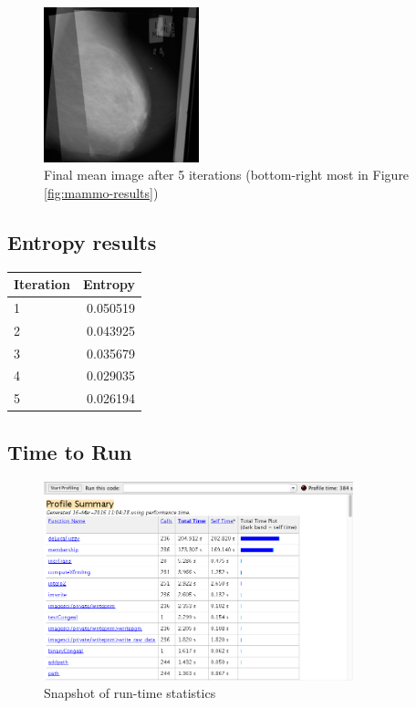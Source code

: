 \documentclass[11pt,fleqn,twoside]{article}
\begin{document}
\begin{figure}[!ht]
  \centering
  \includegraphics[width=0.4\textwidth]{img/final_mean.jpg}
  \caption{Final mean image after 5 iterations (bottom-right most in Figure \ref{fig:mammo-results})}
  \label{fig:final-mean}
\end{figure}

\subsection{Entropy results}

  \begin{tabular}{ | l | r | }
    \hline
    \textbf{Iteration} & \textbf{Entropy} \\
    \hline
    1 & 0.050519 \\ \hline
    2 & 0.043925 \\ \hline
    3 & 0.035679 \\ \hline
    4 & 0.029035 \\ \hline
    5 & 0.026194 \\ \hline
  \end{tabular}

\subsection{Time to Run}

\begin{figure}[!ht]
  \centering
  \includegraphics[width=0.8\textwidth]{img/Run-time.png}
  \caption{Snapshot of run-time statistics}
  \label{fig:run-time}
\end{figure}
\end{document}
